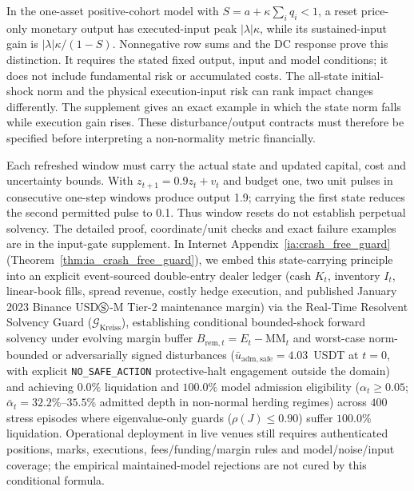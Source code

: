 \documentclass[12pt]{article}
\theoremstyle{definition}
\theoremstyle{remark}
\begin{document}
In the one-asset positive-cohort model with $S=a+\kappa\sum_iq_i<1$, a reset price-only monetary output has executed-input peak $|\lambda|\kappa$, while its sustained-input gain is $|\lambda|\kappa/(1-S)$. Nonnegative row sums and the DC response prove this distinction. It requires the stated fixed output, input and model conditions; it does not include fundamental risk or accumulated costs. The all-state initial-shock norm and the physical execution-input risk can rank impact changes differently. The supplement gives an exact example in which the state norm falls while execution gain rises. These disturbance/output contracts must therefore be specified before interpreting a non-normality metric financially.

Each refreshed window must carry the actual state and updated capital, cost and uncertainty bounds. With $z_{t+1}=0.9z_t+v_t$ and budget one, two unit pulses in consecutive one-step windows produce output 1.9; carrying the first state reduces the second permitted pulse to 0.1. Thus window resets do not establish perpetual solvency. The detailed proof, coordinate/unit checks and exact failure examples are in the input-gate supplement. In Internet Appendix~\ref{ia:crash_free_guard} (Theorem~\ref{thm:ia_crash_free_guard}), we embed this state-carrying principle into an explicit event-sourced double-entry dealer ledger (cash $K_t$, inventory $I_t$, linear-book fills, spread revenue, costly hedge execution, and published January 2023 Binance USD$\circledS$-M Tier-2 maintenance margin) via the Real-Time Resolvent Solvency Guard ($\mathcal{G}_{\mathrm{Kreiss}}$), establishing conditional bounded-shock forward solvency under evolving margin buffer $B_{\mathrm{rem},t} = E_t - \mathrm{MM}_t$ and worst-case norm-bounded or adversarially signed disturbances ($\bar{u}_{\mathrm{adm,safe}} = 4.03$~USDT at $t=0$, with explicit \texttt{NO\_SAFE\_ACTION} protective-halt engagement outside the domain) and achieving $0.0\%$ liquidation and $100.0\%$ model admission eligibility ($\alpha_t \ge 0.05$; $\bar{\alpha}_t = 32.2\%$--$35.5\%$ admitted depth in non-normal herding regimes) across $400$ stress episodes where eigenvalue-only guards ($\rho(J) \le 0.90$) suffer $100.0\%$ liquidation. Operational deployment in live venues still requires authenticated positions, marks, executions, fees/funding/margin rules and model/noise/input coverage; the empirical maintained-model rejections are not cured by this conditional formula.
\end{document}
